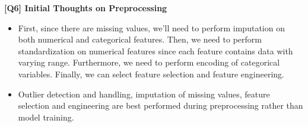 \documentclass{article}
\begin{document}
\begin{description}
	\item \textbf{[Q6] Initial Thoughts on Preprocessing}
		\begin{itemize}
			\item First, since there are missing values, we'll need to perform imputation on both numerical and categorical features. Then, we need to perform standardization on numerical features since each feature contains data with varying range. Furthermore, we need to perform encoding of categorical variables. Finally, we can select feature selection and feature engineering.
			\item Outlier detection and handling, imputation of missing values, feature selection and engineering are best performed during preprocessing rather than model training.
		\end{itemize}


\end{description}
\end{document}
